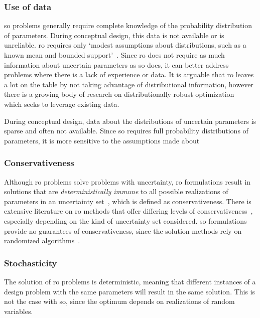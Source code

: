 \subsubsection{Use of data}

\gls{so} problems generally require complete knowledge of the probability distribution of
parameters. During conceptual design, this data is not available or is unreliable.
\gls{ro} requires only `modest assumptions  about distributions, such as a known mean and
bounded support'~\cite{Chen2007}. Since \gls{ro} does not require as much information
about uncertain parameters as \gls{so} does, it can better address problems where there
is a lack of experience or data. It is arguable that \gls{ro}
leaves a lot on the table by not taking advantage of distributional information,
however there is a growing body of research on distributionally robust optimization~\cite{Bertsimas2017}
which seeks to leverage existing data.

During conceptual design, data about the distributions of uncertain parameters
is sparse and often not available. Since \gls{so} requires full probability distributions
of parameters, it is more sensitive to the assumptions made about 

\subsubsection{Conservativeness}

Although \gls{ro} problems solve problems with uncertainty,
\gls{ro} formulations result in solutions that are \emph{deterministically immune}
to all possible realizations of parameters in an uncertainty set~\cite{Bertsimas2011},
which is defined as conservativeness. There is extensive literature on \gls{ro} methods
that offer differing levels of conservativeness~\cite{Bertsimas2004}, especially
depending on the kind of uncertainty set considered.
\gls{so} formulations provide no guarantees of conservativeness,
since the solution methods rely on randomized algorithms~\cite{Shmoys2004}.

\subsubsection{Stochasticity}

The solution of \gls{ro} problems is deterministic,
meaning that different instances of a design problem with
the same parameters will result in the same solution. This is not the case with \gls{so},
since the optimum depends on realizations of random variables.

